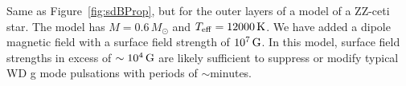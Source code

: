 \label{fig:WDProp}
Same as Figure~\ref{fig:sdBProp}, but for the outer layers of a model of a ZZ-ceti star. The model has $M=0.6\,M_\odot$ and $T_{\rm eff} = 12000 \, {\rm K}$. We have added a dipole magnetic field with a surface field strength of $10^7 \, {\rm G}$. In this model, surface field strengths in excess of $\sim 10^4 \, {\rm G}$ are likely sufficient to suppress or modify typical WD g mode pulsations with periods of $\sim$minutes.
